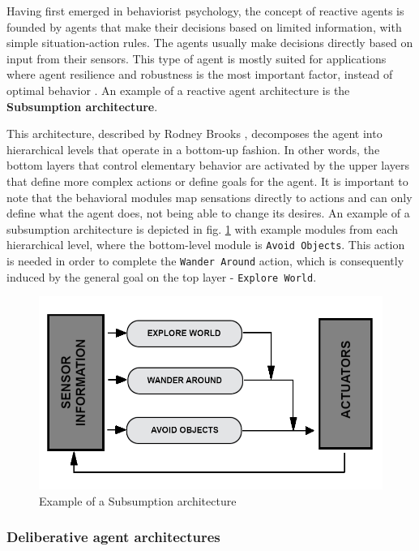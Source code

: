 \documentclass[0main.tex]{subfiles}
\begin{document}
Having first emerged in behaviorist psychology, the concept of reactive agents is founded by agents
that make their decisions based on limited information, with simple situation-action rules. The agents
usually make decisions directly based on input from their sensors. This type of agent is mostly
suited for applications where agent resilience and robustness is the most important factor, instead
of optimal behavior \cite{Anthony2014}. An example of a reactive agent architecture is the
\textbf{Subsumption architecture}.

This architecture, described by Rodney Brooks \cite{1087032},
decomposes the agent into hierarchical levels that operate in a bottom-up
fashion. In other words, the bottom layers that control elementary behavior are
activated by the upper layers that define more complex actions or define goals for
the agent. It is important to note that the behavioral modules map sensations
directly to actions and can only define what the agent does, not being able to
change its desires. An example of a subsumption architecture is depicted in fig.
\ref{Subsumption} with example modules from each hierarchical level, where the
bottom-level module is \texttt{Avoid Objects}. This action is needed in order
to complete the \texttt{Wander Around} action, which is consequently induced by the
general goal on the top layer - \texttt{Explore World}.

\begin{figure}[htbp]
    \centering
    \includegraphics[width = .8\textwidth]{Subsumption_Architecture_Abstract_Diagram-unified.png}
    \caption{Example of a Subsumption architecture}
    \label{Subsumption}
\end{figure}

\subsubsection{Deliberative agent architectures}
\end{document}
